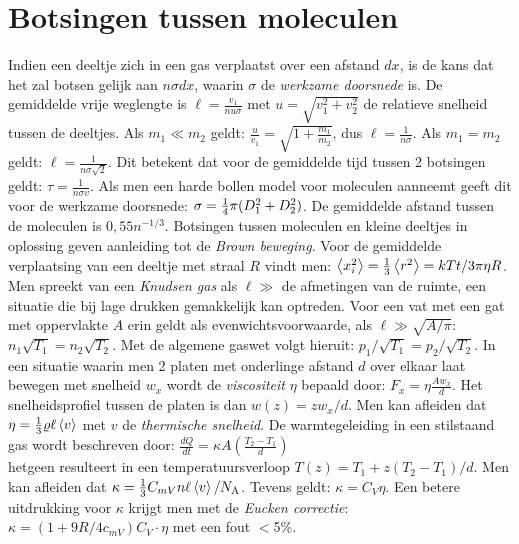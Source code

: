 \documentclass[twoside]{report}
\begin{document}
\section{Botsingen tussen moleculen}
Indien een deeltje zich in een gas verplaatst over een afstand $dx$, is de
kans dat het zal botsen gelijk aan $n\sigma dx$, waarin $\sigma$ de
{\it werkzame doorsnede} is. De gemiddelde vrije weglengte is
$\displaystyle\ell=\frac{v_1}{nu\sigma}$ met $u=\sqrt{v_1^2+v_2^2}$ de relatieve
snelheid tussen de deeltjes. Als $m_1\ll m_2$ geldt:
$\displaystyle\frac{u}{v_1}=\sqrt{1+\frac{m_1}{m_2}}$, dus
$\displaystyle\ell=\frac{1}{n\sigma}$. Als $m_1=m_2$ geldt:
$\displaystyle\ell=\frac{1}{n\sigma\sqrt{2}}$. Dit betekent dat voor de
gemiddelde tijd tussen 2 botsingen geldt: $\displaystyle\tau=\frac{1}{n\sigma v}$.
Als men een harde bollen model voor moleculen aanneemt geeft dit voor de
werkzame doorsnede: $\sigma=\mbox{$\frac{1}{4}$}\pi(D_1^2+D_2^2)$. De gemiddelde afstand
tussen de moleculen is $0,55n^{-1/3}$. Botsingen tussen moleculen en
kleine deeltjes in oplossing geven aanleiding tot de {\it Brown beweging}.
Voor de gemiddelde verplaatsing van een deeltje met straal $R$ vindt men:
$\left\langle x_i^2 \right\rangle=\frac{1}{3}\left\langle r^2 \right\rangle=kTt/3\pi\eta R$.
\npar
Men spreekt van een {\it Knudsen gas} als $\ell\gg$ de afmetingen van de
ruimte, een situatie die bij lage drukken gemakkelijk kan optreden. Voor een
vat met een gat met oppervlakte $A$ erin geldt als evenwichtsvoorwaarde,
als $\ell\gg\sqrt{A/\pi}$: $n_1\sqrt{T_1}=n_2\sqrt{T_2}$. Met de algemene
gaswet volgt hieruit: $p_1/\sqrt{T_1}=p_2/\sqrt{T_2}$.
\npar
In een situatie waarin men 2 platen met onderlinge afstand $d$ over elkaar
laat bewegen met snelheid $w_x$ wordt de {\it viscositeit} $\eta$ bepaald
door: $\displaystyle F_x=\eta\frac{Aw_x}{d}$. Het snelheidsprofiel tussen de
platen is dan $w(z)=zw_x/d$. Men kan afleiden dat
$\eta=\frac{1}{3}\varrho\ell\left\langle v \right\rangle$ met $v$ de {\it thermische snelheid}.
\npar
De warmtegeleiding in een stilstaand gas wordt beschreven door:
$\displaystyle\frac{dQ}{dt}=\kappa A\left(\frac{T_2-T_1}{d}\right)$\\
hetgeen resulteert in een temperatuursverloop $T(z)=T_1+z(T_2-T_1)/d$. Men kan
afleiden dat $\kappa=\frac{1}{3}C_{mV}n\ell\left\langle v \right\rangle/N_{\rm A}$. Tevens geldt:
$\kappa=C_V\eta$. Een betere uitdrukking voor $\kappa$ krijgt men met de
{\it Eucken correctie}: $\kappa=(1+9R/4c_{mV})C_V\cdot\eta$ met een fout $<$5\%.
\end{document}
